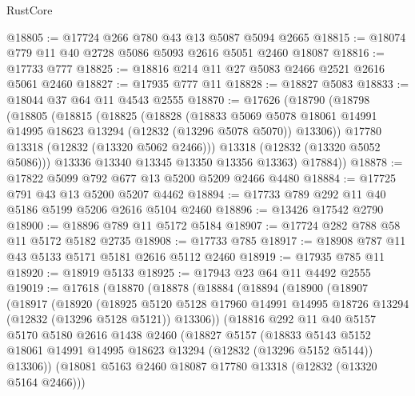 \begin{lexlean}{RustCore}
\begin{coremodule}
@18805 := @17724 @266 @780 @43 @13 @5087 @5094 @2665
@18815 := @18074 @779 @11 @40 @2728 @5086 @5093 @2616 @5051 @2460 @18087
@18816 := @17733 @777
@18825 := @18816 @214 @11 @27 @5083 @2466 @2521 @2616 @5061 @2460
@18827 := @17935 @777 @11
@18828 := @18827 @5083
@18833 := @18044 @37 @64 @11 @4543 @2555
@18870 := @17626
    (@18790
      (@18798
        (@18805
          (@18815
            (@18825
              (@18828
                (@18833
                  @5069
                  @5078
                  @18061
                  @14991
                  @14995
                  @18623
                  @13294
                  (@12832 (@13296 @5078 @5070))
                  @13306))
              @17780
              @13318
              (@12832 (@13320 @5062 @2466)))
            @13318
            (@12832 (@13320 @5052 @5086)))
          @13336
          @13340
          @13345
          @13350
          @13356
          @13363)
        @17884))
@18878 := @17822 @5099 @792 @677 @13 @5200 @5209 @2466 @4480
@18884 := @17725 @791 @43 @13 @5200 @5207 @4462
@18894 := @17733 @789 @292 @11 @40 @5186 @5199 @5206 @2616 @5104 @2460
@18896 := @13426 @17542 @2790
@18900 := @18896 @789 @11 @5172 @5184
@18907 := @17724 @282 @788 @58 @11 @5172 @5182 @2735
@18908 := @17733 @785
@18917 := @18908 @787 @11 @43 @5133 @5171 @5181 @2616 @5112 @2460
@18919 := @17935 @785 @11
@18920 := @18919 @5133
@18925 := @17943 @23 @64 @11 @4492 @2555
@19019 := @17618
    (@18870
      (@18878
        (@18884
          (@18894
            (@18900
              (@18907
                (@18917
                  (@18920
                    (@18925
                      @5120
                      @5128
                      @17960
                      @14991
                      @14995
                      @18726
                      @13294
                      (@12832 (@13296 @5128 @5121))
                      @13306))
                  (@18816
                    @292
                    @11
                    @40
                    @5157
                    @5170
                    @5180
                    @2616
                    @1438
                    @2460
                    (@18827
                      @5157
                      (@18833
                        @5143
                        @5152
                        @18061
                        @14991
                        @14995
                        @18623
                        @13294
                        (@12832 (@13296 @5152 @5144))
                        @13306))
                    (@18081 @5163 @2460 @18087 @17780 @13318 (@12832 (@13320 @5164 @2466)))

\end{coremodule}
\end{lexlean}
